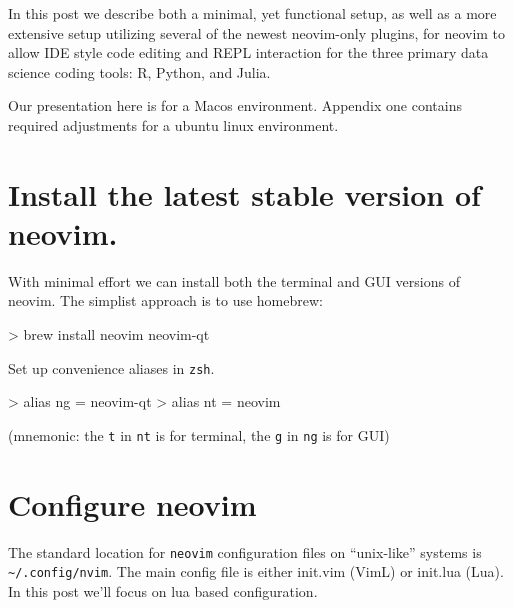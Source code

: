 \documentclass[
  letterpaper,
  DIV=11,
  numbers=noendperiod,
  oneside]{scrartcl}
\newenvironment{Shaded}{\begin{snugshade}}{\end{snugshade}}
\newcommand{\ExtensionTok}[1]{\textcolor[rgb]{0.00,0.23,0.31}{#1}}
\newcommand{\FunctionTok}[1]{\textcolor[rgb]{0.28,0.35,0.67}{#1}}
\newcommand{\NormalTok}[1]{\textcolor[rgb]{0.00,0.23,0.31}{#1}}
\newcommand{\OperatorTok}[1]{\textcolor[rgb]{0.37,0.37,0.37}{#1}}
\begin{document}
In this post we describe both a minimal, yet functional setup, as well
as a more extensive setup utilizing several of the newest neovim-only
plugins, for neovim to allow IDE style code editing and REPL interaction
for the three primary data science coding tools: R, Python, and Julia.

Our presentation here is for a Macos environment. Appendix one contains
required adjustments for a ubuntu linux environment.

\hypertarget{install-the-latest-stable-version-of-neovim.}{%
\section{Install the latest stable version of
neovim.}\label{install-the-latest-stable-version-of-neovim.}}

With minimal effort we can install both the terminal and GUI versions of
neovim. The simplist approach is to use homebrew:

\begin{Shaded}
\begin{Highlighting}[]
\OperatorTok{\textgreater{}}\NormalTok{ brew }\FunctionTok{install}\NormalTok{ neovim neovim{-}qt}
\end{Highlighting}
\end{Shaded}

Set up convenience aliases in \texttt{zsh}.

\begin{Shaded}
\begin{Highlighting}[]
\OperatorTok{\textgreater{}}\NormalTok{ alias }\ExtensionTok{ng}\NormalTok{ = neovim{-}qt}
\OperatorTok{\textgreater{}}\NormalTok{ alias }\ExtensionTok{nt}\NormalTok{ = neovim}
\end{Highlighting}
\end{Shaded}

(mnemonic: the \texttt{t} in \texttt{nt} is for terminal, the \texttt{g}
in \texttt{ng} is for GUI)

\hypertarget{configure-neovim}{%
\section{Configure neovim}\label{configure-neovim}}

The standard location for \texttt{neovim} configuration files on
``unix-like'' systems is \texttt{\textasciitilde{}/.config/nvim}. The
main config file is either init.vim (VimL) or init.lua (Lua). In this
post we'll focus on lua based configuration.
\end{document}
